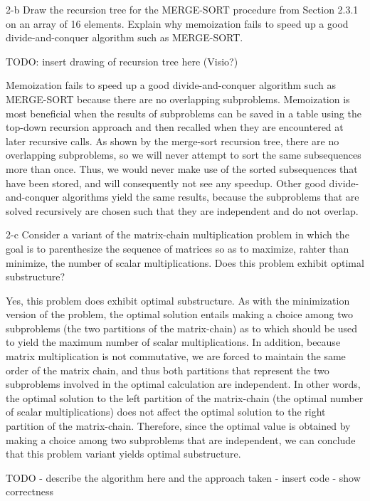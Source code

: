 \documentclass[11pt]{article}
\begin{document}
\begin{prob}{2-b}
Draw the recursion tree for the MERGE-SORT procedure from Section 2.3.1 on an array of 16 elements. Explain why memoization fails to speed up a good divide-and-conquer algorithm such as MERGE-SORT.
\end{prob}
\begin{sol}

TODO: insert drawing of recursion tree here (Visio?)

Memoization fails to speed up a good divide-and-conquer algorithm such as MERGE-SORT because there are no overlapping subproblems. Memoization is most beneficial when the results of subproblems can be saved in a table using the top-down recursion approach and then recalled when they are encountered at later recursive calls. As shown by the merge-sort recursion tree, there are no overlapping subproblems, so we will never attempt to sort the same subsequences more than once. Thus, we would never make use of the sorted subsequences that have been stored, and will consequently not see any speedup. Other good divide-and-conquer algorithms yield the same results, because the subproblems that are solved recursively are chosen such that they are independent and do not overlap. 
\end{sol}

\begin{prob}{2-c}
Consider a variant of the matrix-chain multiplication problem in which the goal is to parenthesize the sequence of matrices so as to maximize, rahter than minimize, the number of scalar multiplications. Does this problem exhibit optimal substructure?
\end{prob}
\begin{sol}
Yes, this problem does exhibit optimal substructure. As with the minimization version of the problem, the optimal solution entails making a choice among two subproblems (the two partitions of the matrix-chain) as to which should be used to yield the maximum number of scalar multiplications. In addition, because matrix multiplication is not commutative, we are forced to maintain the same order of the matrix chain, and thus both partitions that represent the two subproblems involved in the optimal calculation are independent. In other words, the optimal solution to the left partition of the matrix-chain (the optimal number of scalar multiplications) does not affect the optimal solution to the right partition of the matrix-chain. Therefore, since the optimal value is obtained by making a choice among two subproblems that are independent, we can conclude that this problem variant yields optimal substructure.
\end{sol}

\begin{prob}{3}
\end{prob}
\begin{sol}
TODO - describe the algorithm here and the approach taken - insert code - show correctness
\end{sol}
\end{document}
